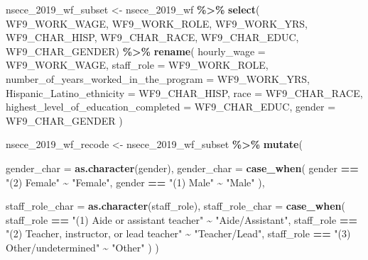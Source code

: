 \documentclass[
]{article}
\newenvironment{Shaded}{\begin{snugshade}}{\end{snugshade}}
\newcommand{\AttributeTok}[1]{\textcolor[rgb]{0.13,0.29,0.53}{#1}}
\newcommand{\FunctionTok}[1]{\textcolor[rgb]{0.13,0.29,0.53}{\textbf{#1}}}
\newcommand{\NormalTok}[1]{#1}
\newcommand{\OtherTok}[1]{\textcolor[rgb]{0.56,0.35,0.01}{#1}}
\newcommand{\SpecialCharTok}[1]{\textcolor[rgb]{0.81,0.36,0.00}{\textbf{#1}}}
\newcommand{\StringTok}[1]{\textcolor[rgb]{0.31,0.60,0.02}{#1}}
\begin{document}
\begin{Shaded}
\begin{Highlighting}[]
\NormalTok{nsece\_2019\_wf\_subset }\OtherTok{\textless{}{-}}
\NormalTok{  nsece\_2019\_wf }\SpecialCharTok{\%\textgreater{}\%}
  \FunctionTok{select}\NormalTok{(}
\NormalTok{    WF9\_WORK\_WAGE,}
\NormalTok{    WF9\_WORK\_ROLE,}
\NormalTok{    WF9\_WORK\_YRS,}
\NormalTok{    WF9\_CHAR\_HISP,}
\NormalTok{    WF9\_CHAR\_RACE,}
\NormalTok{    WF9\_CHAR\_EDUC,}
\NormalTok{    WF9\_CHAR\_GENDER) }\SpecialCharTok{\%\textgreater{}\%}
  \FunctionTok{rename}\NormalTok{(}
    \AttributeTok{hourly\_wage =}\NormalTok{ WF9\_WORK\_WAGE,}
    \AttributeTok{staff\_role =}\NormalTok{ WF9\_WORK\_ROLE,}
    \AttributeTok{number\_of\_years\_worked\_in\_the\_program =}\NormalTok{ WF9\_WORK\_YRS,}
    \AttributeTok{Hispanic\_Latino\_ethnicity =}\NormalTok{ WF9\_CHAR\_HISP,}
    \AttributeTok{race =}\NormalTok{ WF9\_CHAR\_RACE,}
    \AttributeTok{highest\_level\_of\_education\_completed =}\NormalTok{ WF9\_CHAR\_EDUC,}
    \AttributeTok{gender =}\NormalTok{ WF9\_CHAR\_GENDER}
\NormalTok{  )}
\end{Highlighting}
\end{Shaded}

\begin{Shaded}
\begin{Highlighting}[]
\NormalTok{nsece\_2019\_wf\_recode }\OtherTok{\textless{}{-}}
\NormalTok{  nsece\_2019\_wf\_subset }\SpecialCharTok{\%\textgreater{}\%}
  \FunctionTok{mutate}\NormalTok{(}

    \AttributeTok{gender\_char =} \FunctionTok{as.character}\NormalTok{(gender),}
    \AttributeTok{gender\_char =} \FunctionTok{case\_when}\NormalTok{(}
\NormalTok{      gender }\SpecialCharTok{==} \StringTok{"(2) Female"} \SpecialCharTok{\textasciitilde{}} \StringTok{"Female"}\NormalTok{,}
\NormalTok{      gender }\SpecialCharTok{==} \StringTok{"(1) Male"} \SpecialCharTok{\textasciitilde{}} \StringTok{"Male"}
\NormalTok{    ),}

    \AttributeTok{staff\_role\_char =} \FunctionTok{as.character}\NormalTok{(staff\_role),}
    \AttributeTok{staff\_role\_char =} \FunctionTok{case\_when}\NormalTok{(}
\NormalTok{      staff\_role }\SpecialCharTok{==} \StringTok{"(1) Aide or assistant teacher"} \SpecialCharTok{\textasciitilde{}} \StringTok{"Aide/Assistant"}\NormalTok{,}
\NormalTok{      staff\_role }\SpecialCharTok{==} \StringTok{"(2) Teacher, instructor, or lead teacher"} \SpecialCharTok{\textasciitilde{}} \StringTok{"Teacher/Lead"}\NormalTok{,}
\NormalTok{      staff\_role }\SpecialCharTok{==} \StringTok{"(3) Other/undetermined"} \SpecialCharTok{\textasciitilde{}} \StringTok{"Other"}
\NormalTok{    )}
\NormalTok{  )}
\end{Highlighting}
\end{Shaded}
\end{document}
